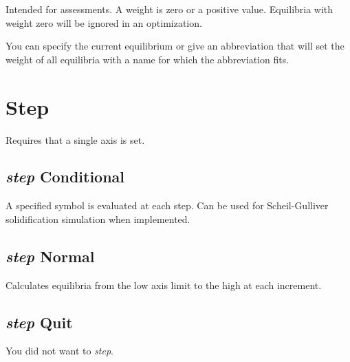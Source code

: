 \documentclass[12pt]{article}
\begin{document}
Intended for assessments.  A weight is zero or a positive value.
Equilibria with weight zero will be ignored in an optimization.  

You can specify the current equilibrium or give an abbreviation that
will set the weight of all equilibria with a name for which the
abbreviation fits.

\section{Step }

Requires that a single axis is set.

\subsection{{\em step} Conditional}

A specified symbol is evaluated at each step.  Can be used for
Scheil-Gulliver solidification simulation when implemented.

\subsection{{\em step} Normal}

Calculates equilibria from the low axis limit to the high at each
increment.  

\subsection{{\em step} Quit}

You did not want to {\em step}.
\end{document}
